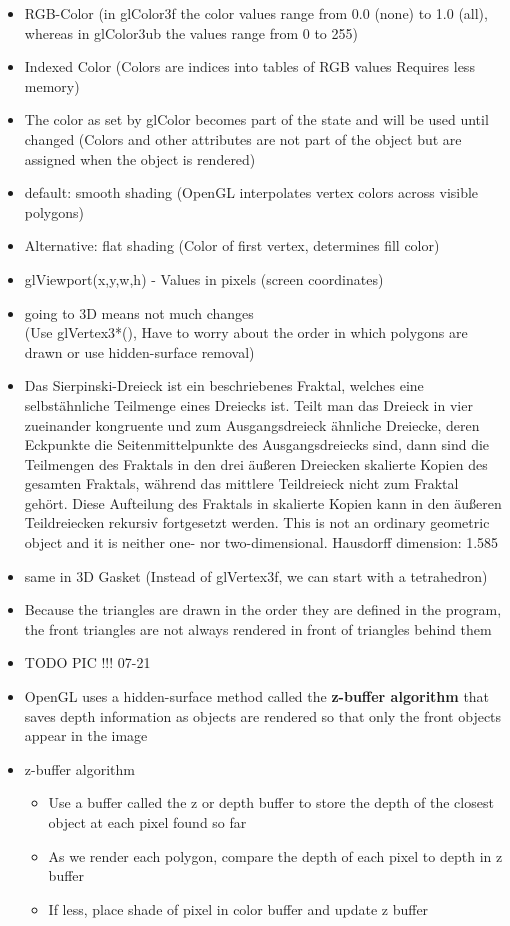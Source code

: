 \documentclass[11pt,a4paper]{article}
\begin{document}
\begin{itemize}
			\item RGB-Color (in glColor3f the color values range from 0.0 (none) to 1.0 (all), whereas in glColor3ub the values range from 0 to 255)
			\item Indexed Color (Colors are indices into tables of RGB values Requires less memory)
			\item The color as set by glColor becomes part of the state and will be used until changed (Colors and other attributes are not part of the object but are assigned when the object is rendered)
			\item default: smooth shading (OpenGL interpolates vertex colors across visible polygons)
			\item Alternative: flat shading (Color of first vertex, determines fill color)
			\item glViewport(x,y,w,h) - Values in pixels (screen coordinates)
			\item going to 3D means not much changes\\
			(Use glVertex3*(), Have to worry about the order in which polygons are drawn or use hidden-surface removal)
			\item Das Sierpinski-Dreieck ist ein beschriebenes Fraktal, welches eine selbstähnliche Teilmenge eines Dreiecks ist. Teilt man das Dreieck in vier zueinander kongruente und zum Ausgangsdreieck ähnliche Dreiecke, deren Eckpunkte die Seitenmittelpunkte des Ausgangsdreiecks sind, dann sind die Teilmengen des Fraktals in den drei äußeren Dreiecken skalierte Kopien des gesamten Fraktals, während das mittlere Teildreieck nicht zum Fraktal gehört. Diese Aufteilung des Fraktals in skalierte Kopien kann in den äußeren Teildreiecken rekursiv fortgesetzt werden. 
			This is not an ordinary geometric object and it is neither one- nor two-dimensional. Hausdorff dimension: 1.585	
			\item same in 3D Gasket (Instead of glVertex3f, we can start with a tetrahedron)
			\item Because the triangles are drawn in the order they are defined in the program, the front triangles are not always rendered in front of triangles behind them
			\item TODO PIC !!! 07-21
			\item OpenGL uses a hidden-surface method called the \textbf{z-buffer algorithm} that saves depth information as objects are rendered so that only the front objects appear in the image
			\item z-buffer algorithm
				\begin{itemize}
					\item Use a buffer called the z or depth buffer to store the depth of the closest object at each pixel found so far
					\item As we render each polygon, compare the depth of each pixel to depth in z buffer
					\item If less, place shade of pixel in color buffer and update z buffer
				\end{itemize}
		\end{itemize}
\end{document}
